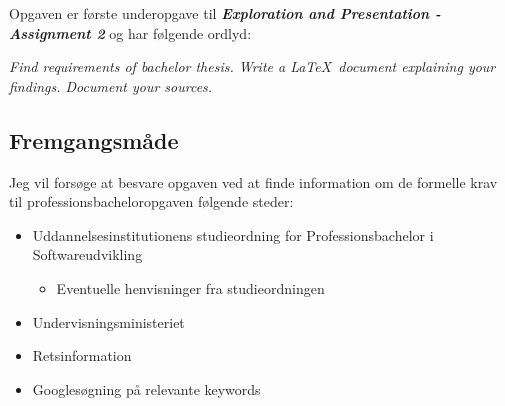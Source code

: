 
Opgaven er første underopgave til \textbf{\textit{Exploration and Presentation - Assignment 2}} og har følgende ordlyd:
\begin{displayquote}
\emph{Find requirements of bachelor thesis. Write a \LaTeX\ document explaining your
findings. Document your sources.} \cite{ufo}
\end{displayquote}
\vspace{0.5cm}
\subsection{Fremgangsmåde}
\label{sec:1.1}
Jeg vil forsøge at besvare opgaven ved at finde information om de formelle krav til professionsbacheloropgaven følgende steder:

\begin{itemize}
  \item Uddannelsesinstitutionens studieordning for Professionsbachelor i Softwareudvikling
      \begin{itemize}
      \item Eventuelle henvisninger fra studieordningen
    \end{itemize}
  \item Undervisningsministeriet
  \item Retsinformation
  \item Googlesøgning på relevante keywords
\end{itemize}






